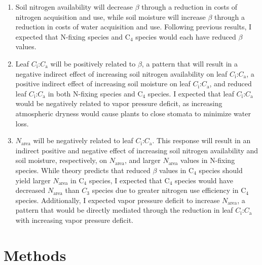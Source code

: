 \begin{enumerate}
    \item Soil nitrogen availability will decrease $\beta$ through a reduction in costs of nitrogen acquisition and use, while soil moisture will increase $\beta$ through a reduction in costs of water acquisition and use. Following previous results, I expected that N-fixing species and C$_4$ species would each have reduced $\beta$ values.
    
    \item Leaf $C_\mathrm{i}$:$C_\mathrm{a}$ will be positively related to $\beta$, a pattern that will result in a negative indirect effect of increasing soil nitrogen availability on leaf $C_\mathrm{i}$:$C_\mathrm{a}$, a positive indirect effect of increasing soil moisture on leaf $C_\mathrm{i}$:$C_\mathrm{a}$, and reduced leaf $C_\mathrm{i}$:$C_\mathrm{a}$ in both N-fixing species and C$_4$ species. I expected that leaf $C_\mathrm{i}$:$C_\mathrm{a}$ would be negatively related to vapor pressure deficit, as increasing atmospheric dryness would cause plants to close stomata to minimize water loss.

    \item $N_\mathrm{area}$ will be negatively related to leaf $C_\mathrm{i}$:$C_\mathrm{a}$. This response will result in an indirect positive and negative effect of increasing soil nitrogen availability and soil moisture, respectively, on $N_\mathrm{area}$, and larger $N_\mathrm{area}$ values in N-fixing species. While theory predicts that reduced $\beta$ values in C$_4$ species should yield larger $N_\mathrm{area}$ in C$_4$ species, I expected that C$_4$ species would have decreased $N_\mathrm{area}$ than $C_3$ species due to greater nitrogen use efficiency in C$_4$ species. Additionally, I expected vapor pressure deficit to increase $N_\mathrm{area}$, a pattern that would be directly mediated through the reduction in leaf $C_\mathrm{i}$:$C_\mathrm{a}$ with increasing vapor pressure deficit.
\end{enumerate}

\section{Methods}

